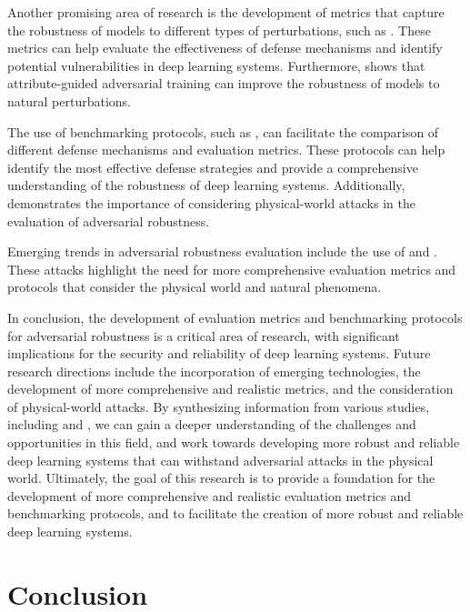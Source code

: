 \documentclass[11pt,a4paper]{article}
\begin{document}
Another promising area of research is the development of metrics that capture the robustness of models to different types of perturbations, such as \cite{arxiv:1801.02612}. These metrics can help evaluate the effectiveness of defense mechanisms and identify potential vulnerabilities in deep learning systems. Furthermore, \cite{doi:10.1609/aaai.v35i9.16927} shows that attribute-guided adversarial training can improve the robustness of models to natural perturbations.

The use of benchmarking protocols, such as \cite{doi:10.1109/tgrs.2022.3225306}, can facilitate the comparison of different defense mechanisms and evaluation metrics. These protocols can help identify the most effective defense strategies and provide a comprehensive understanding of the robustness of deep learning systems. Additionally, \cite{arxiv:1707.08945} demonstrates the importance of considering physical-world attacks in the evaluation of adversarial robustness.

Emerging trends in adversarial robustness evaluation include the use of \cite{arxiv:1904.00759} and \cite{arxiv:2203.03818}. These attacks highlight the need for more comprehensive evaluation metrics and protocols that consider the physical world and natural phenomena. 

In conclusion, the development of evaluation metrics and benchmarking protocols for adversarial robustness is a critical area of research, with significant implications for the security and reliability of deep learning systems. Future research directions include the incorporation of emerging technologies, the development of more comprehensive and realistic metrics, and the consideration of physical-world attacks. By synthesizing information from various studies, including \cite{doi:10.24963/ijcai.2021/694} and \cite{doi:10.1007/978-3-030-58589-1_3}, we can gain a deeper understanding of the challenges and opportunities in this field, and work towards developing more robust and reliable deep learning systems that can withstand adversarial attacks in the physical world. Ultimately, the goal of this research is to provide a foundation for the development of more comprehensive and realistic evaluation metrics and benchmarking protocols, and to facilitate the creation of more robust and reliable deep learning systems.


\section{Conclusion}
\end{document}
